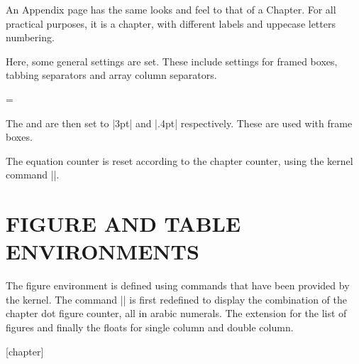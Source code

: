 An Appendix page has the same looks and feel to that of a Chapter. For all practical purposes, it is a chapter, with different labels and uppecase letters numbering.



 Here, some general settings are set. These include settings for framed boxes, tabbing separators and array column separators.

\begin{teX}
\setlength{}
\setlength{}
\setlength{}
\setlength{}
\setlength{}
\skip\@mpfootins = \skip\footins
\end{teX}

The  and  are then set to |3pt| and |.4pt| respectively. These are used with frame boxes.

\begin{teX}
\setlength{}
\setlength{}
\end{teX}


The equation counter is reset according to the chapter counter, using the \latex kernel command |\@addtoreset|. 

\begin{teX}
\renewcommand\theequation
  {\ifnum \c@chapter>\z@ \thechapter.\fi \@arabic\c@equation}
\end{teX}

\section{FIGURE AND TABLE ENVIRONMENTS}


 The figure environment is defined using commands that have been provided by the kernel.  The command |\thefigure| is first redefined to display the combination of the chapter dot figure counter, all in arabic numerals. The extension for the list of figures and finally the floats for single column and double column.



\label{book:figure}
\begin{teX}
[chapter]
\renewcommand \thefigure
     {\ifnum \c@chapter>\z@ \thechapter.\fi \@arabic\c@figure}
\def\fps@figure{tbp}
\def\ftype@figure{1}
\def\ext@figure{lof}
\def\fnum@figure{\figurename\nobreakspace\thefigure}
\newenvironment{figure}
               {\@float{figure}}
               {\end@float}
\newenvironment{figure*}
               {\@dblfloat{figure}}
               {\end@dblfloat}
\end{teX}




